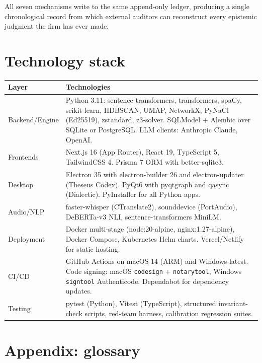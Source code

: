 \documentclass[11pt,letterpaper]{article}
\begin{document}
All seven mechanisms write to the same append-only ledger, producing a single chronological record from which external auditors can reconstruct every epistemic judgment the firm has ever made.

\section{Technology stack}

\begin{longtable}{p{3cm} p{11.5cm}}
\toprule
\textbf{Layer} & \textbf{Technologies} \\
\midrule
\endhead
Backend/Engine & Python 3.11: sentence-transformers, transformers, spaCy, scikit-learn, HDBSCAN, UMAP, NetworkX, PyNaCl (Ed25519), zstandard, z3-solver. SQLModel + Alembic over SQLite or PostgreSQL. LLM clients: Anthropic Claude, OpenAI. \\
Frontends & Next.js 16 (App Router), React 19, TypeScript 5, TailwindCSS 4. Prisma 7 ORM with better-sqlite3. \\
Desktop & Electron 35 with electron-builder 26 and electron-updater (Theseus Codex). PyQt6 with pyqtgraph and qasync (Dialectic). PyInstaller for all Python apps. \\
Audio/NLP & faster-whisper (CTranslate2), sounddevice (PortAudio), DeBERTa-v3 NLI, sentence-transformers MiniLM. \\
Deployment & Docker multi-stage (node:20-alpine, nginx:1.27-alpine), Docker Compose, Kubernetes Helm charts. Vercel/Netlify for static hosting. \\
CI/CD & GitHub Actions on macOS 14 (ARM) and Windows-latest. Code signing: macOS \texttt{codesign} + \texttt{notarytool}, Windows \texttt{signtool} Authenticode. Dependabot for dependency updates. \\
Testing & pytest (Python), Vitest (TypeScript), structured invariant-check scripts, red-team harness, calibration regression suites. \\
\bottomrule
\end{longtable}

\section{Appendix: glossary}
\end{document}
